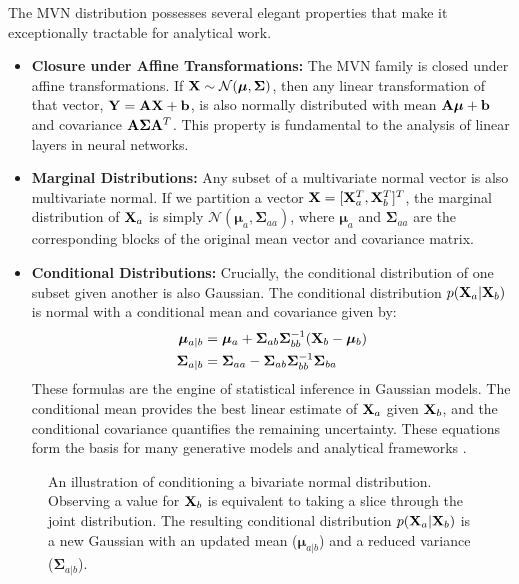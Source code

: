 The MVN distribution possesses several elegant properties that make it exceptionally tractable for analytical work.
\begin{itemize}
    \item \textbf{Closure under Affine Transformations:} The MVN family is closed under affine transformations. If $\mathbf{X} \sim \mathcal{N}(\boldsymbol{\mu}, \boldsymbol{\Sigma})$, then any linear transformation of that vector, $\mathbf{Y} = \mathbf{A}\mathbf{X} + \mathbf{b}$, is also normally distributed with mean $\mathbf{A}\boldsymbol{\mu} + \mathbf{b}$ and covariance $\mathbf{A}\boldsymbol{\Sigma}\mathbf{A}^T$. This property is fundamental to the analysis of linear layers in neural networks.

    \item \textbf{Marginal Distributions:} Any subset of a multivariate normal vector is also multivariate normal. If we partition a vector $\mathbf{X} = [\mathbf{X}_a^T, \mathbf{X}_b^T]^T$, the marginal distribution of $\mathbf{X}_a$ is simply $\mathcal{N}(\boldsymbol{\mu}_a, \boldsymbol{\Sigma}_{aa})$, where $\boldsymbol{\mu}_a$ and $\boldsymbol{\Sigma}_{aa}$ are the corresponding blocks of the original mean vector and covariance matrix.

    \item \textbf{Conditional Distributions:} Crucially, the conditional distribution of one subset given another is also Gaussian. The conditional distribution $p(\mathbf{X}_a | \mathbf{X}_b)$ is normal with a conditional mean and covariance given by:
    \begin{align}
        \boldsymbol{\mu}_{a|b} &= \boldsymbol{\mu}_a + \boldsymbol{\Sigma}_{ab} \boldsymbol{\Sigma}_{bb}^{-1} (\mathbf{X}_b - \boldsymbol{\mu}_b) \\
        \boldsymbol{\Sigma}_{a|b} &= \boldsymbol{\Sigma}_{aa} - \boldsymbol{\Sigma}_{ab} \boldsymbol{\Sigma}_{bb}^{-1} \boldsymbol{\Sigma}_{ba}
    \end{align}
    These formulas are the engine of statistical inference in Gaussian models. The conditional mean provides the best linear estimate of $\mathbf{X}_a$ given $\mathbf{X}_b$, and the conditional covariance quantifies the remaining uncertainty. These equations form the basis for many generative models and analytical frameworks \cite{Murphy2012ML}.
\end{itemize}

\begin{figure}[h!]
    \centering
    \scalebox{0.8}{\conditionalgaussiandiagram}
    \caption{An illustration of conditioning a bivariate normal distribution. Observing a value for $\mathbf{X}_b$ is equivalent to taking a slice through the joint distribution. The resulting conditional distribution $p(\mathbf{X}_a | \mathbf{X}_b)$ is a new Gaussian with an updated mean ($\boldsymbol{\mu}_{a|b}$) and a reduced variance ($\boldsymbol{\Sigma}_{a|b}$).}
    \label{fig:conditional_gaussian}
\end{figure}

